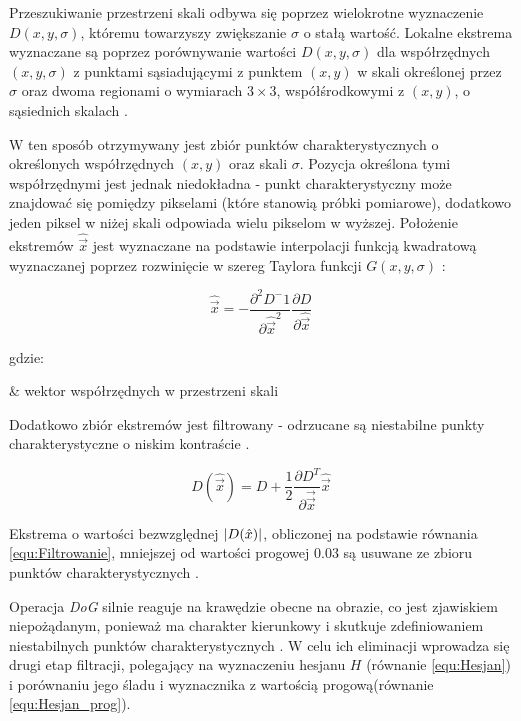 Przeszukiwanie przestrzeni skali odbywa się poprzez wielokrotne wyznaczenie $D(x, y, \sigma)$, któremu towarzyszy zwiększanie $\sigma$ o stałą wartość. Lokalne ekstrema wyznaczane są poprzez porównywanie wartości $D(x, y, \sigma)$ dla współrzędnych $(x, y, \sigma)$ z punktami sąsiadującymi z punktem $(x, y)$ w skali określonej przez $\sigma$ oraz dwoma regionami o wymiarach $3 \times 3$, współśrodkowymi z $(x, y)$, o sąsiednich skalach \cite{Lowe2004}.

W ten sposób otrzymywany jest zbiór punktów charakterystycznych o określonych współrzędnych $(x, y)$ oraz skali $\sigma$. Pozycja określona tymi współrzędnymi jest jednak niedokładna - punkt charakterystyczny
może znajdować się pomiędzy pikselami (które stanowią próbki pomiarowe), dodatkowo jeden piksel w niżej skali odpowiada wielu pikselom w wyższej. Położenie ekstremów $\hat{\vec{x}}$ jest wyznaczane na podstawie interpolacji funkcją kwadratową wyznaczanej poprzez rozwinięcie w szereg Taylora funkcji $G(x, y, \sigma)$ \cite{Lowe2004}:

\begin{equation}
\label{equ:Ekstrema_interpolacja}
	\hat{\vec{x}} = - \frac{\partial^2 D^-1}{\partial \hat{\vec{x}}^2} \frac{\partial D}{\partial \hat{\vec{x}}}
\end{equation}

\noindent
gdzie:

\begin{conditions}
	 & wektor współrzędnych w przestrzeni skali
\end{conditions}

Dodatkowo zbiór ekstremów jest filtrowany - odrzucane są niestabilne punkty charakterystyczne o niskim kontraście \cite{Lowe2004}.

\begin{equation}
\label{equ:Filtrowanie}
	D(\hat{\vec{x}}) = D + \frac{1}{2} \frac{\partial D^T}{\partial \vec{\vec{x}}} \hat{\vec{x}}
\end{equation}

Ekstrema o wartości bezwzględnej $\lvert D(\hat{x})\rvert$, obliczonej na podstawie równania \ref{equ:Filtrowanie}, mniejszej od wartości progowej $0.03$ są usuwane ze zbioru punktów charakterystycznych \cite{Lowe2004}.

Operacja \textit{DoG} silnie reaguje na krawędzie obecne na obrazie, co jest zjawiskiem niepożądanym, ponieważ ma charakter kierunkowy i skutkuje zdefiniowaniem niestabilnych punktów charakterystycznych
\cite{Lowe2004}. W celu ich eliminacji wprowadza się drugi etap filtracji, polegający na wyznaczeniu hesjanu $H$ (równanie \ref{equ:Hesjan}) i porównaniu jego śladu i wyznacznika z wartością progową(równanie \ref{equ:Hesjan_prog}).

